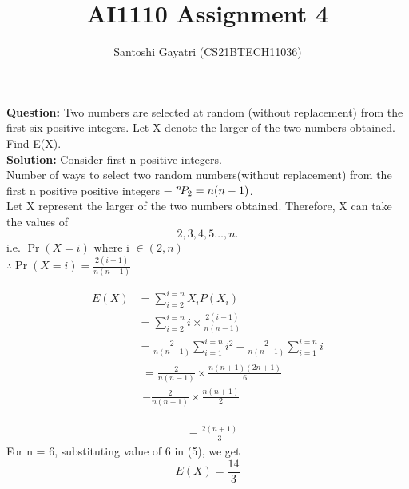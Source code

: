 \documentclass[journal,12pt,twocolumn]{IEEEtran}
\title{AI1110 Assignment 4}
\author{Santoshi Gayatri (CS21BTECH11036)}
\providecommand{\pr}[1]{\ensuremath{\Pr\left(#1\right)}}
\newcommand*{\permcomb}[4][0mu]{{{}^{#3}\mkern#1#2_{#4}}}
\newcommand*{\perm}[1][-3mu]{\permcomb[#1]{P}}
\begin{document}
\maketitle

\textbf{Question:} Two numbers are selected at random (without replacement) from the first six positive integers. Let X denote the larger of the two numbers obtained. Find E(X). \\
                            
\textbf{Solution:}                           
Consider first n positive integers. \\
Number of ways to select two random numbers(without replacement) from the first n positive positive integers = 
$ \perm{n}{2} = n(n-1)$. \\
Let X represent the larger of the two numbers obtained. Therefore, X can take the values of $$2,3,4,5\ldots, n.$$
i.e. \pr{X=i} where i $\in (2,n)$\\[8pt]
$ \therefore  \pr{X=i} = \displaystyle\frac{2(i-1)}{n(n-1)} $

\begin{align}
 E(X) &=\sum_{i = 2}^{i = n}X_iP(X_i) \\
 & = \sum_{i = 2}^{i = n} i \times \frac{2(i-1)}{n(n-1)}\\
 & = \frac{2}{n(n-1)} \sum_{i = 1}^{i = n} i^2 - \frac{2}{n(n-1)}\sum_{i = 1}^{i = n} i
\end{align}
\begin{align}
	\begin{split}
		&= \frac{2}{n(n-1)} \times \frac{n(n+1)(2n+1)}{6}
 \\ 
 	&	-\frac{2}{n(n-1)} \times \frac{n(n+1)}{2}
	\end{split}
\end{align}	
	
\begin{align}
 & = \frac{2(n+1)}{3}
\end{align}
For n = 6, substituting value of 6 in (5), we get\\
$$\boxed{E(X) = \frac{14}{3} }$$
\end{document}
